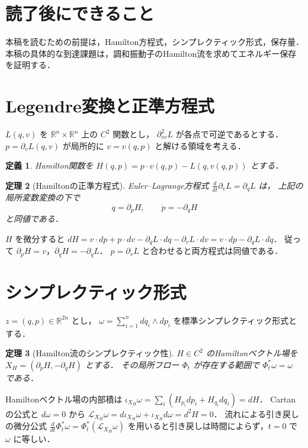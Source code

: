 \documentclass[a5paper,10pt,onecolumn]{jsarticle}
\makeatletter
\theoremstyle{mathnotetheorem}
\newtheorem{theorem}{定理}[section]
\newtheorem{definition}[theorem]{定義}
\renewcommand{\proofname}{証明}
\renewenvironment{proof}[1][\proofname]{%
  \par\pushQED{\qed}\normalfont\topsep4\p@\@plus2\p@\relax
  \trivlist\item[\hskip\labelsep\bfseries #1]\ignorespaces
}{\popQED\endtrivlist\@endpefalse}
\makeatother
\begin{document}
\section*{読了後にできること}
本稿を読むための前提は，Hamilton方程式，シンプレクティック形式，保存量．
本稿の具体的な到達課題は，調和振動子のHamilton流を求めてエネルギー保存を証明する．

\section{Legendre変換と正準方程式}
$L(q,v)$ を $\mathbb R^n\times\mathbb R^n$ 上の $C^2$ 関数とし，
$\partial^2_{vv}L$ が各点で可逆であるとする．
$ p=\partial_vL(q,v)$ が局所的に $v=v(q,p)$ と解ける領域を考える．
\begin{definition}
Hamilton関数を $H(q,p)=p\cdot v(q,p)-L(q,v(q,p))$ とする．
\end{definition}
\begin{theorem}[Hamiltonの正準方程式]
Euler--Lagrange方程式
$\frac d{dt}\partial_vL=\partial_qL$ は，
上記の局所変数変換の下で
\[
 \dot q=\partial_pH,\qquad \dot p=-\partial_qH
\]
と同値である．
\end{theorem}
\begin{proof}
$H$ を微分すると
$dH=v\cdot dp+p\cdot dv-\partial_qL\cdot dq-\partial_vL\cdot dv
=v\cdot dp-\partial_qL\cdot dq$．
従って $\partial_pH=v$，$\partial_qH=-\partial_qL$．
$p=\partial_vL$ と合わせると両方程式は同値である．
\end{proof}
\section{シンプレクティック形式}
$z=(q,p)\in\mathbb R^{2n}$ とし，
$\omega=\sum_{i=1}^n dq_i\wedge dp_i$ を標準シンプレクティック形式とする．
\begin{theorem}[Hamilton流のシンプレクティック性]
$H\in C^2$ のHamiltonベクトル場を
$X_H=(\partial_pH,-\partial_qH)$ とする．
その局所フロー $\Phi_t$ が存在する範囲で
$\Phi_t^*\omega=\omega$ である．
\end{theorem}
\begin{proof}
Hamiltonベクトル場の内部積は
$\iota_{X_H}\omega=\sum_i(H_{p_i}dp_i+H_{q_i}dq_i)=dH$．
Cartanの公式と $d\omega=0$ から
$\mathcal L_{X_H}\omega=d\iota_{X_H}\omega+\iota_{X_H}d\omega=d^2H=0$．
流れによる引き戻しの微分公式
$\frac d{dt}\Phi_t^*\omega=\Phi_t^*(\mathcal L_{X_H}\omega)$
を用いると引き戻しは時間によらず，$t=0$ で $\omega$ に等しい．
\end{proof}
\end{document}
